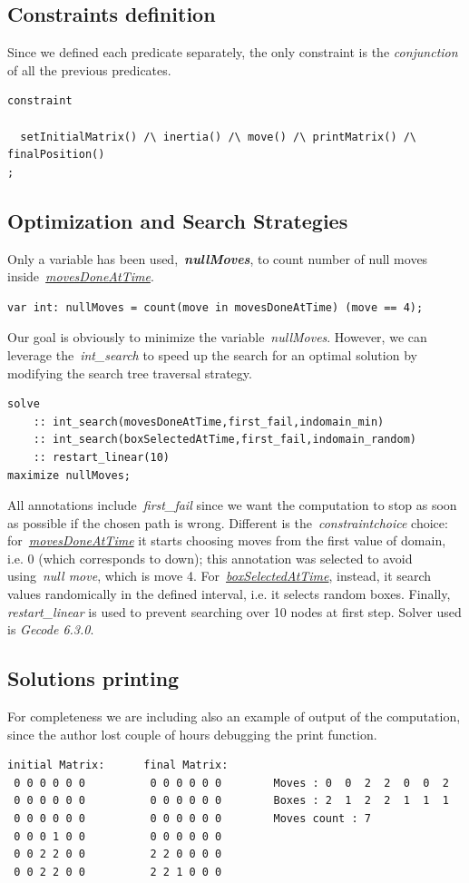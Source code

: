 \documentclass[headinclude, footinclude, abstract=on]{scrarticle}
\begin{document}
\subsection{Constraints definition}
Since we defined each predicate separately, the only constraint is the \textit{conjunction} of all the previous predicates.
\begin{verbatim}
constraint
  
  setInitialMatrix() /\ inertia() /\ move() /\ printMatrix() /\ finalPosition()
;  
\end{verbatim}

\subsection{Optimization and Search Strategies}
Only a variable has been used,~\textbf{\textit{nullMoves}}, to count number of null moves inside~\hyperref[sec:def]{\textit{movesDoneAtTime}}.
\begin{verbatim}
var int: nullMoves = count(move in movesDoneAtTime) (move == 4); 
\end{verbatim}
Our goal is obviously to minimize the variable~\textit{nullMoves}. However, we can leverage the~\textit{int\_search} to speed up the search for an optimal solution by modifying the search tree traversal strategy.
\begin{verbatim}
solve   
    :: int_search(movesDoneAtTime,first_fail,indomain_min)
    :: int_search(boxSelectedAtTime,first_fail,indomain_random)
    :: restart_linear(10)
maximize nullMoves;
\end{verbatim}
All annotations include~\textit{first\_fail} since we want the computation to stop as soon as possible if the chosen path is wrong. Different is the~\textit{constraintchoice} choice: for~\hyperref[sec:def]{\textit{movesDoneAtTime}} it starts choosing moves from the first value of domain, i.e. 0 (which corresponds to down); this annotation was selected to avoid using~\textit{null move}, which is move 4. For~\hyperref[sec:def]{\textit{{boxSelectedAtTime}}}, instead, it search values randomically in the defined interval, i.e. it selects random boxes. Finally, \textit{restart\_linear} is used to prevent searching over 10 nodes at first step. Solver used is \textit{Gecode 6.3.0}.

\subsection{Solutions printing}
For completeness we are including also an example of output of the computation, since the author lost couple of hours debugging the print function.
\begin{verbatim}
initial Matrix:      final Matrix:
 0 0 0 0 0 0          0 0 0 0 0 0        Moves : 0  0  2  2  0  0  2 
 0 0 0 0 0 0          0 0 0 0 0 0        Boxes : 2  1  2  2  1  1  1 
 0 0 0 0 0 0          0 0 0 0 0 0        Moves count : 7
 0 0 0 1 0 0          0 0 0 0 0 0
 0 0 2 2 0 0          2 2 0 0 0 0
 0 0 2 2 0 0          2 2 1 0 0 0
\end{verbatim}
\end{document}

